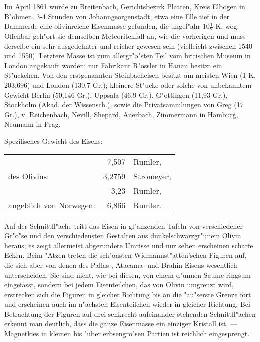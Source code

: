 \documentclass[a4paper, 11pt, oneside]{article}
\begin{document}
Im April 1861 wurde zu Breitenbach, Gerichtsbezirk Platten, Kreis Elbogen in B"ohmen, 3-4 Stunden von Johanngeorgenstadt, etwa eine Elle tief in der Dammerde eine olivinreiche Eisenmasse gefunden, die ungef"ahr $\mathfrak{10\frac{1}{2}}$ K. wog. Offenbar geh"ort sie demselben Meteoritenfall an, wie die vorherigen und muss derselbe ein sehr ausgedehnter und reicher gewesen sein (vielleicht zwischen 1540 und 1550). Letztere Masse ist zum allergr"o"sten Teil vom britischen Museum in London angekauft worden; nur Fabrikant R"ossler in Hanau besitzt ein St"uckchen. Von den erstgenannten Steinbacheisen besitzt am meisten Wien (1 K. 203,696) und London (130,7 Gr.); kleinere St"ucke oder solche von unbekanntem Gewicht Berlin (50,146 Gr.), Uppsala (46,9 Gr.), G"ottingen (11,93 Gr.), Stockholm (Akad. der Wissensch.), sowie die Privatsammlungen von Greg (17 Gr.), v. Reichenbach, Nevill, Shepard, Auerbach, Zimmermann in Hamburg, Neumann in Prag.

Spezifisches Gewicht des Eisens:
\begin{table}[!ht]
    \centering\swabfamily\Large
    \begin{tabular}{l r l}
         & 7,507 & Rumler,\\
        des Olivins: & 3,2759 & Stromeyer,\\
         & 3,23 & Rumler,\\
        angeblich von Norwegen: & 6,866 & Rumler.\\
    \end{tabular}
\end{table}

Auf der Schnittfl"ache tritt das Eisen in gl"anzenden Tafeln von verschiedener Gr"o"se und den verschiedensten Gestalten aus dunkelschwarzgr"unem Olivin heraus; es zeigt allermeist abgerundete Umrisse und nur selten erscheinen scharfe Ecken. Beim "Atzen treten die sch"onsten Widmannst"atten'schen Figuren auf, die sich aber von denen des Pallas-, Atacama- und Brahin-Eisens wesentlich unterscheiden. Sie sind nicht, wie bei diesen, von einem d"unnen Saume ringsum eingefasst, sondern bei jedem Eisenteilchen, das von Olivin umgrenzt wird, erstrecken sich die Figuren in gleicher Richtung bis an die "au"serste Grenze fort und erscheinen auch im n"achsten Eisenteilchen wieder in gleicher Richtung. Bei Betrachtung der Figuren auf drei senkrecht aufeinander stehenden Schnittfl"achen erkennt man deutlich, dass die ganze Eisenmasse ein einziger Kristall ist. --- Magnetkies in kleinen bis "uber erbsengro"sen Partien ist reichlich eingesprengt.
\end{document}

